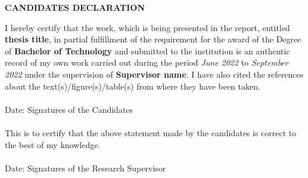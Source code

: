 \newpage
\begin{center}
{\large \bf CANDIDATES DECLARATION}
\end{center}
I hereby certify that the work, which is being presented in the report, entitled {\bf thesis title}, in partial fulfillment of the requirement for the award of the
Degree of {\bf Bachelor of Technology} and submitted to the institution is an authentic record of my own work carried out
during the period \emph{June 2022} to \emph{September 2022} under the supervision of {\bf Supervisor name}.
I have also cited the references about the text(s)/figure(s)/table(s) from where they have been taken.\\
\vspace{0.6in} \\
Date: \hspace{3.4in} Signatures of the Candidates \\
\vspace{0.2in} \\
This is to certify that the above statement made by the candidates is correct to the best of my knowledge. \\
\vspace{0.5in} \\
Date: \hspace{2.65in} Signatures of the Research Supervisor \\

